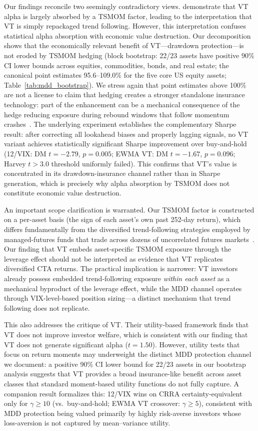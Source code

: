 Our findings reconcile two seemingly contradictory views. \citet{hood2025} demonstrate that VT alpha is largely absorbed by a TSMOM factor, leading to the interpretation that VT is simply repackaged trend following. However, this interpretation confuses statistical alpha absorption with economic value destruction. Our decomposition shows that the economically relevant benefit of VT---drawdown protection---is not eroded by TSMOM hedging (block bootstrap: 22/23 assets have positive 90\% CI lower bounds across equities, commodities, bonds, and real estate; the canonical point estimates 95.6--109.0\% for the five core US equity assets; Table~\ref{tab:mdd_bootstrap}). We stress again that point estimates above 100\% are not a license to claim that hedging creates a stronger standalone insurance technology: part of the enhancement can be a mechanical consequence of the hedge reducing exposure during rebound windows that follow momentum crashes~\citep{daniel2016}. The underlying experiment establishes the complementary Sharpe result: after correcting all lookahead biases and properly lagging signals, no VT variant achieves statistically significant Sharpe improvement over buy-and-hold (12/VIX: DM $t = -2.79$, $p = 0.005$; EWMA VT: DM $t = -1.67$, $p = 0.096$; Harvey $t > 3.0$ threshold uniformly failed). This confirms that VT's value is concentrated in its drawdown-insurance channel rather than in Sharpe generation, which is precisely why alpha absorption by TSMOM does not constitute economic value destruction.

An important scope clarification is warranted. Our TSMOM factor is constructed on a per-asset basis (the sign of each asset's own past 252-day return), which differs fundamentally from the diversified trend-following strategies employed by managed-futures funds that trade across dozens of uncorrelated futures markets~\citep{moskowitz2012}. Our finding that VT embeds asset-specific TSMOM exposure through the leverage effect should not be interpreted as evidence that VT replicates diversified CTA returns. The practical implication is narrower: VT investors already possess embedded trend-following exposure \textit{within each asset} as a mechanical byproduct of the leverage effect, while the MDD channel operates through VIX-level-based position sizing---a distinct mechanism that trend following does not replicate.

This also addresses the \citet{cederburg2020} critique of VT. Their utility-based framework finds that VT does not improve investor welfare, which is consistent with our finding that VT does not generate significant alpha ($t = 1.50$). However, utility tests that focus on return moments may underweight the distinct MDD protection channel we document: a positive 90\% CI lower bound for 22/23 assets in our bootstrap analysis suggests that VT provides a broad insurance-like benefit across asset classes that standard moment-based utility functions do not fully capture. A companion result formalizes this: 12/VIX wins on CRRA certainty-equivalent only for $\gamma \geq 10$ (vs.\ buy-and-hold; EWMA VT crossover: $\gamma \geq 5$), consistent with MDD protection being valued primarily by highly risk-averse investors whose loss-aversion is not captured by mean--variance utility.

